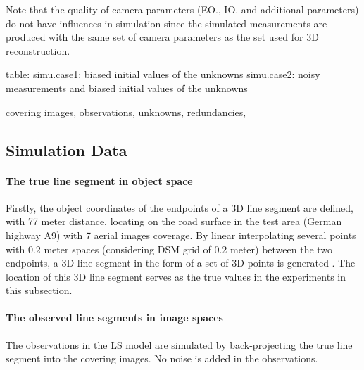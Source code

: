 Note that the quality of camera parameters (EO., IO. and additional parameters) do not have influences in simulation since the simulated measurements are produced with the same set of camera parameters as the set used for 3D reconstruction.

table:
simu.case1: biased initial values of the unknowns
simu.case2: noisy measurements and biased initial values of the unknowns

covering images, observations, unknowns, redundancies, 




\subsection{Simulation Data}
\label{subsec:simudata}

\paragraph{The true line segment in object space}
Firstly, the object coordinates of the endpoints of a 3D line segment are defined, with 77 meter distance, locating on the road surface in the test area (German highway A9) with 7 aerial images coverage. By linear interpolating several points with 0.2 meter spaces (considering DSM grid of 0.2 meter) between the two endpoints, a 3D line segment in the form of a set of 3D points is generated .
The location of this 3D line segment serves as the true values in the experiments in this subsection. 

\paragraph{The observed line segments in image spaces}
The observations in the LS model are simulated by back-projecting the true line segment into the covering images. No noise is added in the observations.

